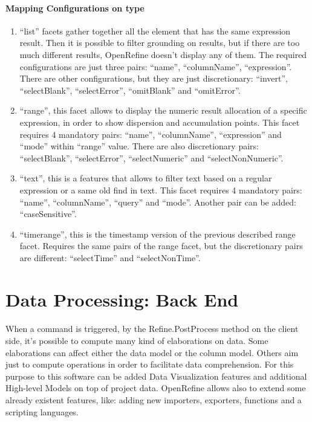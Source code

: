 \paragraph{Mapping Configurations on type}
\begin{enumerate}
		\item \textsf{``list''} facets gather together all the element that has the same expression result. Then it is possible to filter grounding on results, but if there are too much different results, OpenRefine doesn't display any of them. The required configurations are just three pairs: \textsf{``name''}, \textsf{``columnName''}, \textsf{``expression''}. There are other configurations, but they are just discretionary: \textsf{``invert''}, \textsf{``selectBlank''}, \textsf{``selectError''}, \textsf{``omitBlank''} and \textsf{``omitError''}.
		\item \textsf{``range''}, this facet allows to display the numeric result allocation of a specific expression, in order to show dispersion and accumulation points. This facet requires 4 mandatory pairs: \textsf{``name''}, \textsf{``columnName''}, \textsf{``expression''} and \textsf{``mode''} within ``range'' value. There are also discretionary pairs: \textsf{``selectBlank''}, \textsf{``selectError''}, \textsf{``selectNumeric''} and \textsf{``selectNonNumeric''}.
		\item \textsf{``text''}, this is a features that allows to filter text based on a regular expression or a same old find in text. This facet requires 4 mandatory pairs: \textsf{``name''}, \textsf{``columnName''}, \textsf{``query''} and \textsf{``mode''}. Another pair can be added: \textsf{``caseSensitive''}.
		\item \textsf{``timerange''}, this is the timestamp version of the previous described \textsf{range} facet. Requires the same pairs of the range facet, but the discretionary pairs are different: \textsf{``selectTime''} and \textsf{``selectNonTime''}.
\end{enumerate}


\section{Data Processing: Back End}
\paragraph{}
When a command is triggered, by the Refine.PostProcess method on the client side, it's possible to compute many kind of elaborations on data. Some elaborations can affect either the data model or the column model. Others aim just to compute operations in order to facilitate data comprehension. For this purpose to this software can be added Data Visualization features and additional High-level Models on top of project data. OpenRefine allows also to extend some already existent features, like: adding new importers, exporters, functions and a scripting languages. 

